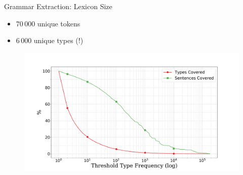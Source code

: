 \documentclass{beamer}
\begin{document}
{
\begin{frame}{Grammar Extraction: Lexicon}
\alert{Size} 
\begin{itemize}
    \item[] 70\,000 unique tokens 
    \item[] 6\,000 unique types (!)
\end{itemize}

\centering
\begin{figure}
\includegraphics[scale=0.22]{sparsity.pdf}
\end{figure}
\end{frame}
}
\end{document}
